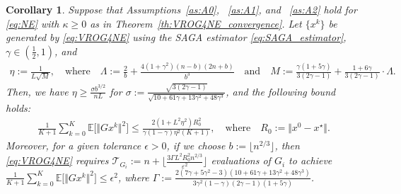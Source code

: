 \documentclass{article}
\newcommand{\sets}[1]{\{#1\}}
\newcommand{\norms}[1]{\Vert#1\Vert}
\newcommand{\Expk}[1]{\mathbb{E}\big[#1\big]}
\newcommand{\Tc}{\mathcal{T}}
\theoremstyle{plain}
\newtheorem{corollary}[theorem]{Corollary}
\theoremstyle{definition}
\theoremstyle{remark}
\begin{document}
\begin{corollary}\label{co:SVRG_convergence1_v3_full}
Suppose that Assumptions~\ref{as:A0}, ~\ref{as:A1}, and ~\ref{as:A2} hold for \eqref{eq:NE} with $\kappa \geq 0$ as in Theorem~\ref{th:VROG4NE_convergence}.
Let $\sets{x^k}$ be generated by \eqref{eq:VROG4NE} using the SAGA estimator \eqref{eq:SAGA_estimator}, $\gamma \in \left(\frac{1}{2}, 1\right)$, and
\begin{equation}\label{eq:SFP_para_choice_v3_full}
\begin{array}{l}
\eta := \frac{1}{L\sqrt{M}}, \quad \text{where} \quad \Lambda := \frac{2}{b} + \frac{4(1+\gamma^2)(n-b)(2n+b)}{b^3} \quad \text{and} \quad  M := \frac{\gamma(1+5\gamma)}{3(2\gamma-1)} + \frac{1 + 6\gamma}{3(2\gamma -1) } \cdot \Lambda.
\end{array}
\end{equation}
Then, we have $\eta \geq \frac{\sigma b^{3/2}}{n L}$ for  $\sigma :=  \frac{\sqrt{3(2\gamma-1)}}{\sqrt{10 + 61\gamma + 13\gamma^2 + 48\gamma^3}}$, and the following bound holds:
\begin{equation}\label{eq:SFP_convergence_bound_v3_full}
\begin{array}{ll}
\frac{1}{K+1}\sum_{k=0}^{K} \Expk{ \norms{Gx^k}^2 }   \leq     \frac{2(1 + L^2\eta^2) R_0^2 }{ \gamma(1-\gamma) \eta^2 (K + 1)},  \quad\text{where} \quad R_0 :=  \norms{x^0 - x^{\star}}.
\end{array}
\end{equation}
Moreover, for a given tolerance $\epsilon > 0$, if we choose $b := \lfloor n^{2/3} \rfloor$, then  \eqref{eq:VROG4NE} requires $\Tc_{G_i} := n + \big\lfloor \frac{ 3\Gamma L^2R_0^2 n^{2/3}}{ \varepsilon^2} \big\rfloor$ evaluations of $G_i$ to achieve $\frac{1}{K+1}\sum_{k=0}^{K} \Expk{ \norms{Gx^k }^2 } \leq \epsilon^2$, where $\Gamma := \frac{2(7\gamma + 5\gamma^2-3)(10 + 61\gamma + 13\gamma^2 + 48\gamma^3)}{3\gamma^2(1-\gamma)(2\gamma-1)(1+5\gamma)}$.
\end{corollary}
\end{document}
